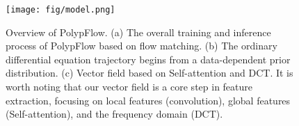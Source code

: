 \begin{figure}[t]
    \centering
    \texttt{[image: fig/model.png]}
    \caption{Overview of PolypFlow. (a) The overall training and inference process of PolypFlow based on flow matching. (b) The ordinary differential equation trajectory begins from a data-dependent prior distribution. (c) Vector field based on Self-attention and DCT. It is worth noting that our vector field is a core step in feature extraction, focusing on local features (convolution), global features (Self-attention), and the frequency domain (DCT).}
    \label{fig:model}
\end{figure}
